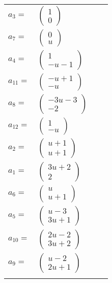 \documentclass[1p]{elsarticle_modified}
\theoremstyle{definition}
\begin{document}
\begin{tabular}{m{7pt} m{180pt} m{7pt} m{180pt} }
\flushright $a_{3}=$&$\begin{pmatrix}1\\0\end{pmatrix}$ \\
\flushright $a_{7}=$&$\begin{pmatrix}0\\u\end{pmatrix}$ \\
\flushright $a_{4}=$&$\begin{pmatrix}1\\- u-1\end{pmatrix}$ \\
\flushright $a_{11}=$&$\begin{pmatrix}- u+1\\- u\end{pmatrix}$ \\
\flushright $a_{8}=$&$\begin{pmatrix}-3 u-3\\-2\end{pmatrix}$ \\
\flushright $a_{12}=$&$\begin{pmatrix}1\\- u\end{pmatrix}$ \\
\flushright $a_{2}=$&$\begin{pmatrix}u+1\\u+1\end{pmatrix}$ \\
\flushright $a_{1}=$&$\begin{pmatrix}3 u+2\\2\end{pmatrix}$ \\
\flushright $a_{6}=$&$\begin{pmatrix}u\\u+1\end{pmatrix}$ \\
\flushright $a_{5}=$&$\begin{pmatrix}u-3\\3 u+1\end{pmatrix}$ \\
\flushright $a_{10}=$&$\begin{pmatrix}2 u-2\\3 u+2\end{pmatrix}$ \\
\flushright $a_{9}=$&$\begin{pmatrix}u-2\\2 u+1\end{pmatrix}$\\&\end{tabular}
\end{document}
